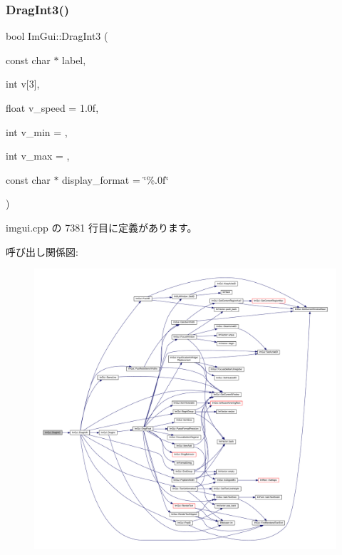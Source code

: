\subsubsection{\texorpdfstring{Drag\+Int3()}{DragInt3()}}
{\footnotesize\ttfamily bool Im\+Gui\+::\+Drag\+Int3 (\begin{DoxyParamCaption}\item[{const char $\ast$}]{label,  }\item[{int}]{v\mbox{[}3\mbox{]},  }\item[{float}]{v\+\_\+speed = {\ttfamily 1.0f},  }\item[{int}]{v\+\_\+min = {},  }\item[{int}]{v\+\_\+max = {},  }\item[{const char $\ast$}]{display\+\_\+format = {\ttfamily \char`\"{}\%.0f\char`\"{}} }\end{DoxyParamCaption})}



 imgui.\+cpp の 7381 行目に定義があります。

呼び出し関係図\+:\nopagebreak
\begin{figure}[H]
\begin{center}
\leavevmode
\includegraphics[width=350pt]{namespace_im_gui_ab0b40f3d0631113d54fa8e0c90ed4f77_cgraph}
\end{center}
\end{figure}
\mbox{\label{namespace_im_gui_a65b6e42ba7a4aa73fd3e1dc74f93d180}} 
